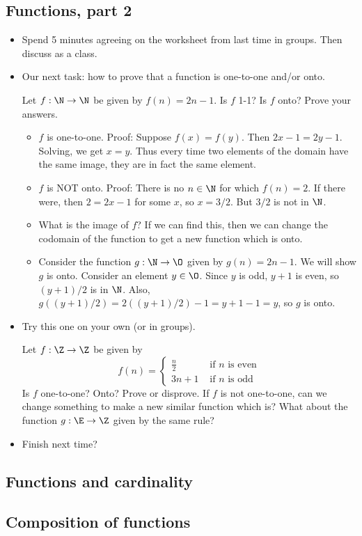 \subsection*{Functions, part 2}
\begin{itemize}
\item Spend 5 minutes agreeing on the worksheet from last time in groups.  Then discuss as a class.
\item Our next task: how to prove that a function is one-to-one and/or onto.

\ex Let $f: \N \to \N$ be given by $f(n) = 2n - 1$.  Is $f$ 1-1?  Is $f$ onto?  Prove your answers.
\begin{itemize}
\item $f$ is one-to-one.  Proof: Suppose $f(x) = f(y)$.  Then $2x - 1 = 2y - 1$.  Solving, we get $x = y$.  Thus every time two elements of the domain have the same image, they are in fact the same element.  
\item $f$ is NOT onto.  Proof: There is no $n \in \N$ for which $f(n) = 2$.  If there were, then $2 = 2x - 1$ for some $x$, so $x = 3/2$.  But $3/2$ is not in $\N$.
\item What is the image of $f$?  If we can find this, then we can change the codomain of the function to get a new function which is onto.
\item Consider the function $g: \N \to \O$ given by $g(n) = 2n -1$.  We will show $g$ is onto.  Consider an element $y \in \O$.  Since $y$ is odd, $y + 1$ is even, so $(y+1)/2$ is in $\N$.  Also, $g((y+1)/2) = 2((y+1)/2) -1 = y + 1 - 1 = y$, so $g$ is onto.
\end{itemize}

\item Try this one on your own (or in groups).  

\ex Let $f: \Z \to \Z$ be given by \[f(n) = \begin{cases}
\frac{n}{2} & \mbox{ if $n$ is even}\\
3n + 1 & \mbox{ if $n$ is odd}
\end{cases}\]  Is $f$ one-to-one?  Onto?  Prove or disprove.  If $f$ is not one-to-one, can we change something to make a new similar function which is?  What about the function $g : \E \to \Z$ given by the same rule?

\item Finish next time?
\end{itemize}

\subsection{Functions and cardinality}


\subsection{Composition of functions}



